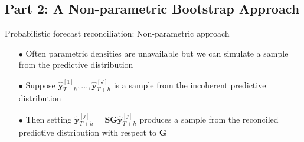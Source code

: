 \documentclass[11pt,xcolor=dvipsnames,handout]{beamer} %
\begin{document}

\subsection{Part 2: A Non-parametric Bootstrap Approach }


\begin{frame}[noframenumbering]{Probabilistic forecast reconciliation: Non-parametric approach}
\begin{itemize}[<+-| alert@+>]
	\item [$\bullet$] Often parametric densities are unavailable but we can simulate a sample from the predictive distribution
	\item[]
	\item [$\bullet$] Suppose $\hat{\bm y}^{[1]}_{T+h},...,\hat{\bm y}^{[J]}_{T+h}$ is a sample from the incoherent predictive distribution
	\item[]
	\item [$\bullet$] Then setting $\tilde{\bm y}^{[j]}_{T+h}=\bm{SG}\hat{\bm y}^{[j]}_{T+h}$ produces a sample from the reconciled predictive distribution with respect to $\bm{G}$
\end{itemize}    
\end{frame}

\end{document}
